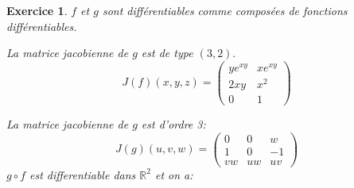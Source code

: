 \documentclass[11pt,a4paper]{report}
\newtheorem{exo}{Exercice}[section]
\begin{document}
\begin{exo}
$f$ et $g$ sont différentiables comme composées de fonctions différentiables.

La matrice jacobienne de $g$ est de type $(3,2).$
\begin{equation*}
J(f)(x,y,z)=\begin{pmatrix}
ye^{xy} & xe^{xy} \\
2xy & x^2\\
0 & 1
\end{pmatrix}
\end{equation*}

La matrice jacobienne de $g$ est d'ordre 3:
\begin{equation*}
J(g)(u,v,w)=\begin{pmatrix}
0 & 0 & w\\
1 & 0 & -1\\
vw & uw & uv
\end{pmatrix}
\end{equation*}
$g\circ f$ est differentiable dans $\mathbb{R}^2$ et on a:
\end{exo}
\end{document}
